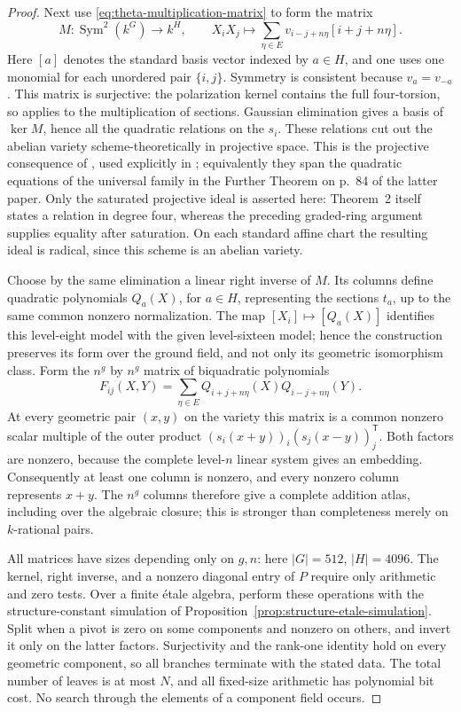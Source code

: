 \documentclass[11pt]{article}
\theoremstyle{definition}
\theoremstyle{remark}
\begin{document}
\begin{proof}
Next use \eqref{eq:theta-multiplication-matrix} to form the matrix
\[
 M:\operatorname{Sym}^2(k^G)\longrightarrow k^H,
 \qquad
 X_iX_j\longmapsto
 \sum_{\eta\in E}v_{i-j+n\eta}[i+j+n\eta].
\]
Here \([a]\) denotes the standard basis vector indexed by \(a\in H\),
and one uses one monomial for each unordered pair \(\{i,j\}\).
Symmetry is consistent because \(v_a=v_{-a}\).
This matrix is surjective: the polarization kernel contains the full
four-torsion, so \citet[\S4, Theorem~1, pp.~338--340]{Mumford1966}
applies to the multiplication of sections.
Gaussian elimination gives a basis of \(\ker M\), hence all the
quadratic relations on the \(s_i\). These relations cut out the abelian
variety scheme-theoretically in projective space. This is the
projective consequence of
\citet[\S4, the graded-ring lemmas on pp.~336--338 and
Theorem~2, pp.~341--348]{Mumford1966}, used explicitly in
\citet[\S6, Step~III, p.~94]{Mumford1967}; equivalently they span the
quadratic equations of the universal family in the Further Theorem
on p.~84 of the latter paper. Only the saturated projective ideal is
asserted here: Theorem~2 itself states a relation in degree four,
whereas the preceding graded-ring argument supplies equality after
saturation. On each standard affine chart the
resulting ideal is radical, since this scheme is an abelian variety.

Choose by the same elimination a linear right inverse of \(M\).
Its columns define quadratic polynomials \(Q_a(X)\), for \(a\in H\),
representing the sections \(t_a\), up to the same common nonzero
normalization. The map \([X_i]\mapsto[Q_a(X)]\) identifies this
level-eight model with the given level-sixteen model; hence the
construction preserves its form over the ground field, and not only
its geometric isomorphism class. Form the \(n^g\) by \(n^g\) matrix of biquadratic
polynomials
\[
 F_{ij}(X,Y)=\sum_{\eta\in E}
    Q_{i+j+n\eta}(X)Q_{i-j+n\eta}(Y).
    \label{eq:theta-biquadratic-atlas}
\]
At every geometric pair \((x,y)\) on the variety this matrix is a
common nonzero scalar multiple of the outer product
\((s_i(x+y))_i(s_j(x-y))_j^{\mathsf T}\). Both factors are nonzero,
because the complete level-\(n\) linear system gives an embedding.
Consequently at least one column is nonzero, and every nonzero column
represents \(x+y\). The \(n^g\) columns therefore give a complete
addition atlas, including over the algebraic closure; this is stronger
than completeness merely on \(k\)-rational pairs.

All matrices have sizes depending only on \(g,n\): here
\(|G|=512\), \(|H|=4096\). The kernel, right inverse, and a nonzero
diagonal entry of \(P\) require only arithmetic and zero tests.
Over a finite \'etale algebra, perform these operations with the
structure-constant simulation of
Proposition~\ref{prop:structure-etale-simulation}. Split when a pivot
is zero on some components and nonzero on others, and invert it only
on the latter factors. Surjectivity and the rank-one identity hold on
every geometric component, so all branches terminate with the stated
data. The total number of leaves is at most \(N\), and all fixed-size
arithmetic has polynomial bit cost. No search through the elements of
a component field occurs.
\end{proof}
\end{document}
